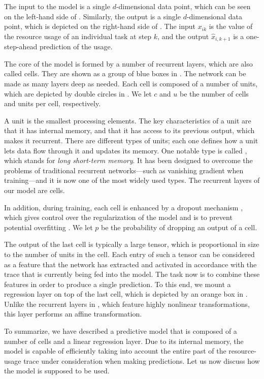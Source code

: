 The input to the model is a single $d$-dimensional data point, which can be seen
on the left-hand side of . Similarly, the output is a single
$d$-dimensional data point, which is depicted on the right-hand side of
. The input $x_{ik}$ is the value of the resource usage of an
individual task at step $k$, and the output $\hat{x}_{i,k + 1}$ is a
one-step-ahead prediction of the usage.

The core of the model is formed by a number of recurrent layers, which are also
called cells. They are shown as a group of blue boxes in . The
network can be made as many layers deep as needed. Each cell is composed of a
number of units, which are depicted by double circles in . We let
$c$ and $u$ be the number of cells and units per cell, respectively.

A unit is the smallest processing elements. The key characteristics of a unit
are that it has internal memory, and that it has access to its previous output,
which makes it recurrent. There are different types of units; each one defines
how a unit lets data flow through it and updates its memory. One notable type is
called  \cite{hochreiter1997}, which stands for \emph{long short-term
memory}. It has been designed to overcome the problems of traditional recurrent
networks---such as vanishing gradient when training---and it is now one of the
most widely used types. The recurrent layers of our model are  cells.

In addition, during training, each cell is enhanced by a dropout mechanism
\cite{zaremba2014}, which gives control over the regularization of the model and
is to prevent potential overfitting \cite{hastie2013}. We let $p$ be the
probability of dropping an output of a cell.

The output of the last cell is typically a large tensor, which is proportional
in size to the number of units in the cell. Each entry of such a tensor can be
considered as a feature that the network has extracted and activated in
accordance with the trace that is currently being fed into the model. The task
now is to combine these features in order to produce a single prediction. To
this end, we mount a regression layer on top of the last cell, which is depicted
by an orange box in . Unlike the recurrent layers in
, which feature highly nonlinear transformations, this layer
performs an affine transformation.

To summarize, we have described a predictive model that is composed of a number
of  cells and a linear regression layer. Due to its internal memory,
the model is capable of efficiently taking into account the entire past of the
resource-usage trace under consideration when making predictions. Let us now
discuss how the model is supposed to be used.
